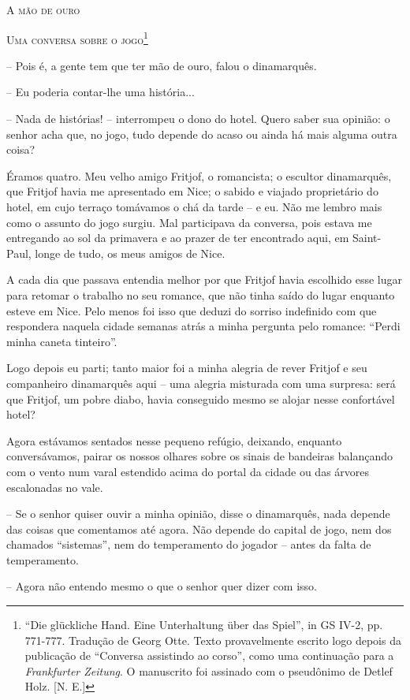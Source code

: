 \textsc{A mão de ouro}

\textsc{Uma conversa sobre o jogo}\footnote{``Die glückliche Hand. Eine
  Unterhaltung über das Spiel'', in GS IV-2, pp. 771-777. Tradução de
  Georg Otte. Texto provavelmente escrito logo depois da publicação de
  ``Conversa assistindo ao corso'', como uma continuação para a
  \emph{Frankfurter Zeitung}. O manuscrito foi assinado com o pseudônimo
  de Detlef Holz. {[}N. E.{]}}

-- Pois é, a gente tem que ter mão de ouro, falou o dinamarquês.

-- Eu poderia contar-lhe uma história...

-- Nada de histórias! -- interrompeu o dono do hotel. Quero saber sua
opinião: o senhor acha que, no jogo, tudo depende do acaso ou ainda há
mais alguma outra coisa?

Éramos quatro. Meu velho amigo Fritjof, o romancista; o escultor
dinamarquês, que Fritjof havia me apresentado em Nice; o sabido e
viajado proprietário do hotel, em cujo terraço tomávamos o chá da tarde
-- e eu. Não me lembro mais como o assunto do jogo surgiu. Mal
participava da conversa, pois estava me entregando ao sol da primavera e
ao prazer de ter encontrado aqui, em Saint-Paul, longe de tudo, os meus
amigos de Nice.

A cada dia que passava entendia melhor por que Fritjof havia escolhido
esse lugar para retomar o trabalho no seu romance, que não tinha saído
do lugar enquanto esteve em Nice. Pelo menos foi isso que deduzi do
sorriso indefinido com que respondera naquela cidade semanas atrás a
minha pergunta pelo romance: ``Perdi minha caneta tinteiro''.

Logo depois eu parti; tanto maior foi a minha alegria de rever Fritjof e
seu companheiro dinamarquês aqui -- uma alegria misturada com uma
surpresa: será que Fritjof, um pobre diabo, havia conseguido mesmo se
alojar nesse confortável hotel?

Agora estávamos sentados nesse pequeno refúgio, deixando, enquanto
conversávamos, pairar os nossos olhares sobre os sinais de bandeiras
balançando com o vento num varal estendido acima do portal da cidade ou
das árvores escalonadas no vale.

-- Se o senhor quiser ouvir a minha opinião, disse o dinamarquês, nada
depende das coisas que comentamos até agora. Não depende do capital de
jogo, nem dos chamados ``sistemas'', nem do temperamento do jogador --
antes da falta de temperamento.

-- Agora não entendo mesmo o que o senhor quer dizer com isso.

